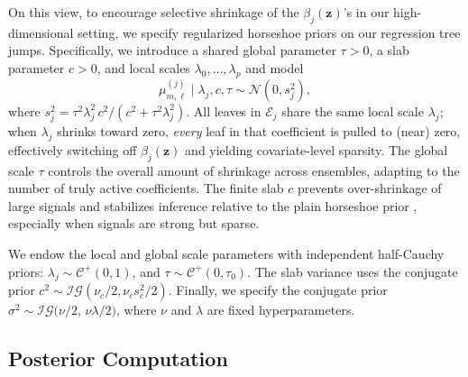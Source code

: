 \documentclass[11pt]{article}
\newcommand{\calE}{\mathcal{E}}
\newcommand{\normaldist}[2]{\mathcal{N}\left(#1,#2\right)} %
\newcommand{\bz}{\bm{z}}
\theoremstyle{plain}
\theoremstyle{definition}
\theoremstyle{plain}
\begin{document}
On this view, to encourage selective shrinkage of the $\beta_{j}(\bz)$'s in our high-dimensional setting, we specify regularized horseshoe priors \citep[RHS;][]{PiironenVehtari2017} on our regression tree jumps.
Specifically, we introduce a shared global parameter $\tau>0$, a slab parameter $c>0$, and local scales $\lambda_{0},\ldots,\lambda_{p}$ and model
\[
\mu^{(j)}_{m,\ell}\mid \lambda_j,c,\tau \sim \normaldist{0}{s_{j}^{2}},
\]
where $s_{j}^{2} = \tau^{2}\lambda_{j}^{2}\,c^{2}/(c^{2} + \tau^{2}\lambda_{j}^{2}).$
All leaves in $\calE_{j}$ share the same local scale $\lambda_j$; when $\lambda_j$ shrinks toward zero, \emph{every} leaf in that coefficient is pulled to (near) zero, effectively switching off $\beta_j(\bz)$ and yielding covariate-level sparsity. 
The global scale $\tau$ controls the overall amount of shrinkage across ensembles, adapting to the number of truly active coefficients. 
The finite slab $c$ prevents over-shrinkage of large signals and stabilizes inference relative to the plain horseshoe prior \citep{pmlr-v54-piironen17a,PiironenVehtari2017}, especially when signals are strong but sparse. 

We endow the local and global scale parameters with independent half-Cauchy priors: \(
\lambda_j\sim \mathcal{C}^+(0,1) \), and \(\tau\sim \mathcal{C}^+(0,\tau_0)\).
The slab variance uses the conjugate prior $c^2\sim\mathcal{IG}(\nu_c/2,\nu_cs_c^2/2)$. 
Finally, we specify the conjugate prior $\sigma^{2} \sim \mathcal{IG} \big({\nu}/{2},\,{\nu\lambda}/{2}\big)$, where $\nu$ and $\lambda$ are fixed hyperparameters.


\subsection{Posterior Computation}
\label{sec:sampler}
\end{document}
